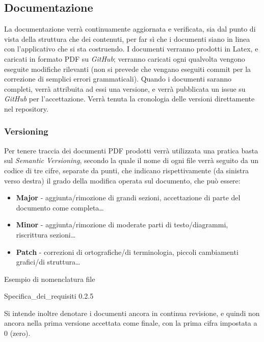 \documentclass{article}
\begin{document}
\subsection{Documentazione}    
La documentazione verrà continuamente aggiornata e verificata, sia dal punto di vista della struttura che dei contenuti, per far sì che i documenti siano in linea con l'applicativo che si sta costruendo. I documenti verranno prodotti in Latex, e caricati in formato PDF su \textit{GitHub}; verranno caricati ogni qualvolta vengono eseguite modifiche rilevanti (non si prevede che vengano eseguiti commit per la correzione di semplici errori grammaticali). Quando i documenti saranno completi, verrà attribuita ad essi una versione, e verrà pubblicata un issue su \textit{GitHub} per l'accettazione. Verrà tenuta la cronologia delle versioni direttamente nel repository. 

\subsubsection{Versioning}
Per tenere traccia dei documenti PDF prodotti verrà utilizzata una pratica basta sul \textit{Semantic Versioning}, secondo la quale il nome di ogni file verrà seguito da un codice di tre cifre, separate da punti, che indicano rispettivamente (da sinistra verso destra) il grado della modifica operata sul documento, che può essere:
\begin{itemize}
    \item \textbf{Major} - aggiunta/rimozione di grandi sezioni, accettazione di parte del documento come completa\dots
    \item \textbf{Minor} - aggiunta/rimozione di moderate parti di testo/diagrammi, riscrittura sezioni\dots
    \item \textbf{Patch} - correzioni di ortografiche/di terminologia, piccoli cambiamenti grafici/di struttura\dots
\end{itemize}

\vspace{.3cm} 

\begin{code*}{Esempio di nomenclatura file}{}
\begin{center}
Specifica\_dei\_requisiti 0.2.5
\end{center}

\end{code*}

Si intende inoltre denotare i documenti ancora in continua revisione, e quindi non ancora nella prima versione accettata come finale, con la prima cifra impostata a 0 (zero). 
\end{document}
